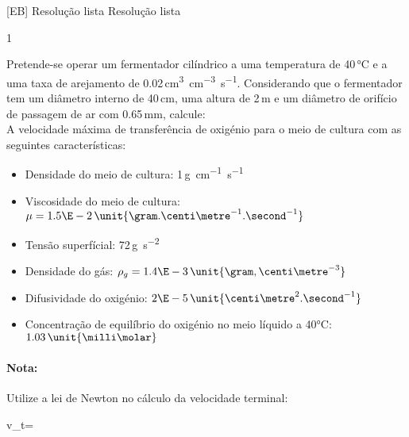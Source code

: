 \documentclass[\mainfilename]{subfiles}
\begin{document}

[EB]
{Resolução lista} %
{Resolução lista} %

\begin{questionBox}1{ %
    Pretende-se operar um fermentador cilíndrico a uma temperatura de 40\,\unit{\celsius} e a uma taxa de arejamento de 0.02\,\unit{\centi\metre^3.\centi\metre^{-3}.\second^{-1}}. Considerando que o fermentador tem um diâmetro interno de 40\,\unit{\centi\metre}, uma altura de 2\,\unit{\metre} e um diâmetro de orifício de passagem de ar com 0.65\,\unit{\milli\metre}, calcule:\\
    A velocidade máxima de transferência de oxigénio para o meio de cultura com as seguintes características:
    \begin{itemize}
        \item Densidade do meio de cultura: 1\,\unit{\gram.\centi\metre^{-1}.\second^{-1}}
        \item Viscosidade do meio de cultura: \(\mu=1.5\E-2\,\unit{\gram.\centi\metre^{-1}.\second^{-1}}\)
        \item Tensão superfícial: 72\,\unit{\gram.\second^{-2}}
        \item Densidade do gás: \(\rho_g=1.4\E-3\,\unit{\gram,\centi\metre^{-3}}\)
        \item Difusividade do oxigénio: \(2\E-5\,\unit{\centi\metre^2.\second^{-1}}\)
        \item Concentração de equilíbrio do oxigénio no meio líquido a 40\unit{\celsius}: \(1.03\,\unit{\milli\molar}\)
    \end{itemize}
} %
    \paragraph*{Nota:}Utilize a lei de Newton no cálculo da velocidade terminal:
    \begin{BM}
        v_t=
    \end{BM}
\end{questionBox}
\end{document}
